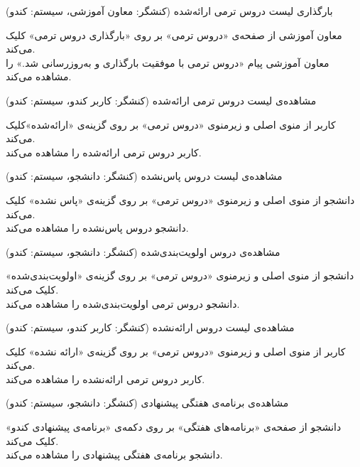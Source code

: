\documentclass{report}
\begin{document}
\textbf{}
بارگذاری لیست دروس ترمی ارائه‌شده (کنشگر: معاون آموزشی، سیستم: کندو)
\begin{addmargin}[.84cm]{0cm}
معاون آموزشی از صفحه‌ی «دروس ترمی» بر روی «بارگذاری دروس ترمی» کلیک می‌کند.\\
معاون آموزشی پیام «دروس ترمی با موفقیت بارگذاری و به‌روزرسانی شد.» را مشاهده می‌کند.
\end{addmargin}

\textbf{}
مشاهده‌ی لیست دروس ترمی ارائه‌شده (کنشگر: کاربر کندو، سیستم: کندو)
\begin{addmargin}[.84cm]{0cm}
کاربر از منوی اصلی و زیرمنوی «دروس ترمی» بر روی گزینه‌ی «ارائه‌‌شده»کلیک می‌کند.\\
کاربر دروس ترمی ارائه‌‌شده را مشاهده می‌کند.
\end{addmargin}

\textbf{}
مشاهده‌ی لیست دروس پاس‌نشده (کنشگر: دانشجو، سیستم: کندو)
\begin{addmargin}[.84cm]{0cm}
دانشجو از منوی اصلی و زیرمنوی «دروس ترمی» بر روی گزینه‌ی «پاس نشده» کلیک می‌کند.\\
دانشجو دروس پاس‌نشده را مشاهده می‌کند.
\end{addmargin}

\textbf{}
مشاهده‌ی دروس اولویت‌بندی‌شده (کنشگر: دانشجو، سیستم: کندو)
\begin{addmargin}[.84cm]{0cm}
دانشجو از منوی اصلی و زیرمنوی «دروس ترمی» بر روی گزینه‌ی «اولویت‌بندی‌‌شده» کلیک می‌کند.\\
دانشجو دروس ترمی اولویت‌بندی‌‌شده را مشاهده می‌کند.
\end{addmargin}

\textbf{}
مشاهده‌ی لیست دروس ارائه‌نشده (کنشگر: کاربر کندو، سیستم: کندو)
\begin{addmargin}[.84cm]{0cm}
کاربر از منوی اصلی و زیرمنوی «دروس ترمی» بر روی گزینه‌ی «ارائه نشده» کلیک می‌کند.\\
کاربر دروس ترمی ارائه‌نشده را مشاهده می‌کند.
\end{addmargin}

\textbf{}
مشاهده‌ی برنامه‌ی هفتگی پیشنهادی (کنشگر: دانشجو، سیستم: کندو)
\begin{addmargin}[.84cm]{0cm}
دانشجو از صفحه‌ی «برنامه‌های هفتگی» بر روی دکمه‌ی «برنامه‌ی پیشنهادی کندو» کلیک می‌کند.\\
دانشجو برنامه‌ی هفتگی پیشنهادی را مشاهده می‌کند.
\end{addmargin}
\end{document}
